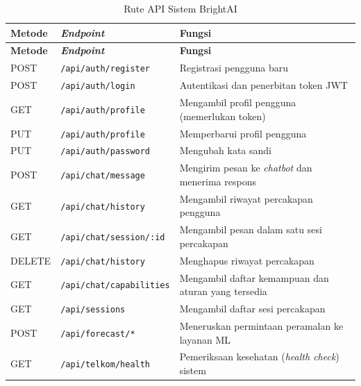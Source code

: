 \begin{longtable}{|p{2cm}|p{5.5cm}|p{6.5cm}|}
\caption{Rute API Sistem BrightAI} \label{tab:api-routes} \\
\hline
\textbf{Metode} & \textbf{\textit{Endpoint}} & \textbf{Fungsi} \\
\hline
\endfirsthead
\hline
\textbf{Metode} & \textbf{\textit{Endpoint}} & \textbf{Fungsi} \\
\hline
\endhead
\hline
\endfoot
POST & \texttt{/api/auth/register} & Registrasi pengguna baru \\
\hline
POST & \texttt{/api/auth/login} & Autentikasi dan penerbitan token JWT \\
\hline
GET & \texttt{/api/auth/profile} & Mengambil profil pengguna (memerlukan token) \\
\hline
PUT & \texttt{/api/auth/profile} & Memperbarui profil pengguna \\
\hline
PUT & \texttt{/api/auth/password} & Mengubah kata sandi \\
\hline
POST & \texttt{/api/chat/message} & Mengirim pesan ke \textit{chatbot} dan menerima respons \\
\hline
GET & \texttt{/api/chat/history} & Mengambil riwayat percakapan pengguna \\
\hline
GET & \texttt{/api/chat/session/:id} & Mengambil pesan dalam satu sesi percakapan \\
\hline
DELETE & \texttt{/api/chat/history} & Menghapus riwayat percakapan \\
\hline
GET & \texttt{/api/chat/capabilities} & Mengambil daftar kemampuan dan aturan yang tersedia \\
\hline
GET & \texttt{/api/sessions} & Mengambil daftar sesi percakapan \\
\hline
POST & \texttt{/api/forecast/*} & Meneruskan permintaan peramalan ke layanan ML \\
\hline
GET & \texttt{/api/telkom/health} & Pemeriksaan kesehatan (\textit{health check}) sistem \\
\hline
\end{longtable}
